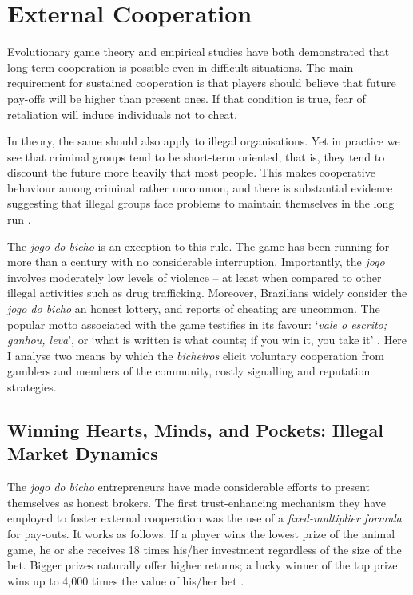 \documentclass[a4paper,12pt]{article}
\begin{document}
\section{External Cooperation}%
\label{sec:external}

Evolutionary game theory \citep{axelrod1984evolution, axelrod1985achieving, smith1982evolution} and empirical studies \citep{isaac1984divergent, ostrom1990governing} have both demonstrated that long-term cooperation is possible even in difficult situations. The main requirement for sustained cooperation is that players should believe that future pay-offs will be higher than present ones. If that condition is true, fear of retaliation will induce individuals not to cheat. 

In theory, the same should also apply to illegal organisations. Yet in practice we see that criminal groups tend to be short-term oriented, that is, they tend to discount the future more heavily that most people. This makes cooperative behaviour among criminal rather uncommon, and there is substantial evidence suggesting that illegal groups face problems to maintain themselves in the long run \citep[e.g.,][]{gambetta2009codes, leeson2010pirational, skarbek2011governance, skarbek2012prison, varese2001russian}. 

The \emph{jogo do bicho} is an exception to this rule. The game has been running for more than a century with no considerable interruption. Importantly, the \textit{jogo} involves moderately low levels of violence -- at least when compared to other illegal activities such as drug trafficking. Moreover, Brazilians widely consider the \textit{jogo do bicho} an honest lottery, and reports of cheating are uncommon. The popular motto associated with the game testifies in its favour: `\textit{vale o escrito; ganhou, leva}', or `what is written is what counts; if you win it, you take it' \citep{magalhaes2005ganhou}. Here I analyse two means by which the \textit{bicheiros} elicit voluntary cooperation from gamblers and members of the community, costly signalling and reputation strategies. 

\subsection{Winning Hearts, Minds, and Pockets: Illegal Market Dynamics}%
\label{sub:pockets}

The \emph{jogo do bicho} entrepreneurs have made considerable efforts to present themselves as honest brokers. The first trust-enhancing mechanism they have employed to foster external cooperation was the use of a \emph{fixed-multiplier formula} for pay-outs. It works as follows. If a player wins the lowest prize of the animal game, he or she receives 18 times his/her investment regardless of the size of the bet. Bigger prizes naturally offer higher returns; a lucky winner of the top prize wins up to 4,000 times the value of his/her bet \citetext{\citealp[89]{labronici2012paratodos}; \citealp[20]{magalhaes2005ganhou}}.
\end{document}
